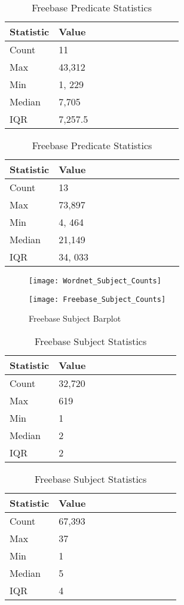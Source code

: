 \begin{table}[H]
	\parbox{.5\linewidth}{
		\caption{Wordnet Predicate Statistics}
		\centering
		\begin{tabular}{lllllllllll}
  			\textbf{Statistic} & \textbf{Value}  \\
  			\hline
			Count & 11 \\
			Max & 43,312  \\
			Min & 1, 229  \\
  			Median & 7,705  \\
  			IQR & 7,257.5  \\
		\end{tabular}
		}
	\hfill
	\parbox{.5\linewidth}{
		\caption{Freebase Predicate Statistics}
		\centering
		\begin{tabular}{lllllllllll}
  			\textbf{Statistic} & \textbf{Value}  \\
  			\hline
			Count & 13 \\
			Max & 73,897  \\
			Min & 4, 464  \\
  			Median & 21,149  \\
  			IQR & 34, 033  \\
		\end{tabular}
		}
\end{table}


\begin{figure}[H]
	\parbox{.5\linewidth}{
   		\caption{Wordnet Subject Barplot}
   		\centering
    		\texttt{[image: Wordnet\_Subject\_Counts]}
		}
	\hfill
	\parbox{.5\linewidth}{
		\caption{Freebase Subject Barplot}
   		\centering
		\texttt{[image: Freebase\_Subject\_Counts]}
		}
\end{figure}


\begin{table}[H]
	\parbox{.5\linewidth}{
		\caption{Wordnet Subject Statistics}
		\centering
		\begin{tabular}{lllllllllll}
  			\textbf{Statistic} & \textbf{Value}  \\
  			\hline
			Count & 32,720 \\
			Max & 619 \\
			Min & 1 \\
  			Median & 2 \\
  			IQR & 2 \\
		\end{tabular}
		}
	\hfill
	\parbox{.5\linewidth}{
		\caption{Freebase Subject Statistics}
		\centering
		\begin{tabular}{lllllllllll}
  			\textbf{Statistic} & \textbf{Value}  \\
  			\hline
			Count & 67,393 \\
			Max & 37 \\
			Min & 1 \\
  			Median & 5 \\
  			IQR & 4 \\
		\end{tabular}
		}
\end{table}

